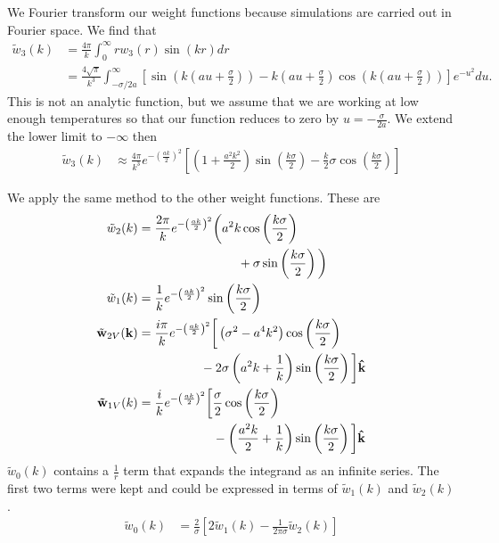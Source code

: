 \documentclass[letterpaper,twocolumn,amsmath,amssymb,prb]{revtex4-1}
\newcommand{\kk}{\textbf{k}}
\begin{document}
We Fourier transform our weight functions because simulations are
carried out in Fourier space.  We find that
\begin{align}
  \tilde{w}_3(k) &= \frac{4\pi}{k} \int_0^\infty r w_3(r) \sin(kr) dr \\ 
  &= \frac{4\sqrt{\pi}}{k^3}\int_{-\sigma/2a}^\infty \left[
    \sin(k(au+\frac{\sigma}{2})) - k(au + \frac{\sigma}{2})
    \cos(k(au+\frac{\sigma}{2}))\right] e^{-u^2} du.
\end{align}
This is not an analytic function, but we assume that we are working at
low enough temperatures so that our function reduces to zero by $u=
-\frac{\sigma}{2a}$. We extend the lower limit to $-\infty$ then
\begin{align}
  \tilde{w}_3(k) &\approx
  \frac{4\pi}{k^3}e^{-\left(\frac{ak}{2}\right)^2}\left[ \left(1 +
    \frac{a^2k^2}{2} \right) \sin\left(\frac{k\sigma}{2}\right) -
    \frac{k}{2} \sigma\cos\left(\frac{k \sigma}{2}\right) \right]
\end{align}

We apply the same method to the other weight functions. These are
\begin{align}
  \tilde{w}_2(k) &=\frac{2\pi}{k} e^{-\left(\frac{ak}{2} \right)^2}
  \bigg(a^2 k \cos\left(\frac{k\sigma}{2}\right) \notag \\
  & \hspace{8em}+\sigma \sin\left(\frac{k\sigma}{2}\right) \bigg) \\ 
  \tilde{w}_1(k) &=
  \frac{1}{k}e^{-\left(\frac{ak}{2} \right)^2}
  \sin\left(\frac{k\sigma}{2}\right) \\
  \tilde{\mathbf{w}}_{2V}(\kk) &=
  \frac{i \pi}{k} e^{-\left(\frac{ak}{2} \right)^2}\bigg[ \left(\sigma^2 - a^4k^2\right)
    \cos\left(\frac{k\sigma}{2}\right) \notag\\ 
    & \hspace{5em}- 2\sigma \left(a^2k + \frac{1}{k}
    \right)\sin\left(\frac{k\sigma}{2}\right) \bigg]
  \mathbf{\hat{k}} \\ 
  \mathbf{\tilde{w}}_{1V}(k)&= \frac{i}{k}
   e^{-\left(\frac{ak}{2} \right)^2} \bigg[ \frac{\sigma}{2}
    \cos\left(\frac{k\sigma}{2}\right) \notag\\
    & \hspace{6em}- \left( \frac{a^2k}{2} +
    \frac{1}{k} \right) \sin\left(\frac{k\sigma}{2}\right) \bigg]
  \mathbf{\hat{k}}
\end{align}
$\tilde{w}_0(k)$ contains a $\frac{1}{r}$ term that expands the
integrand  as an infinite series. The first two terms were kept and
could be expressed in terms of $\tilde{w}_1(k)$ and
$\tilde{w}_2(k)$.
\begin{align}
  \tilde{w}_0(k) &= \frac{2}{\sigma} \left[2\tilde{w}_1(k) - \frac{1}{2 \pi
      \sigma}\tilde{w}_2(k) \right]
\end{align}
\end{document}
